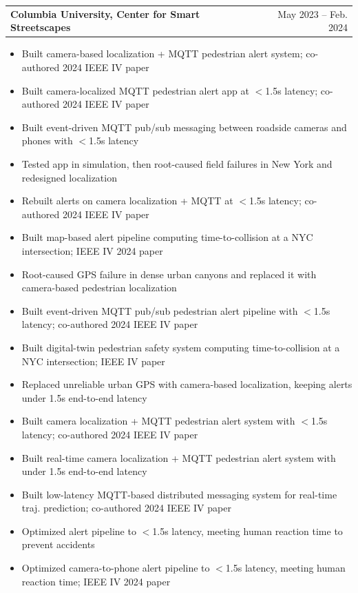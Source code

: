 \documentclass[letterpaper,11pt]{article}
\makeatletter
\newcommand{\resumeItem}[1]{
  \item\small{
    {#1 \vspace{-2pt}}
  }
}
\newcommand{\resumeResearchHeading}[2]{
  \vspace{-2pt}\item
    \begin{tabular*}{0.97\textwidth}[t]{l@{\extracolsep{\fill}}r}
      \textbf{#1} & #2 \\
    \end{tabular*}\vspace{-7pt}
}
\newcommand{\resumeItemListStart}{\begin{itemize}}
\newcommand{\resumeItemListEnd}{\end{itemize}\vspace{-5pt}}
\makeatother
\begin{document}
    \resumeResearchHeading
      {Columbia University, Center for Smart Streetscapes}{May 2023 -- Feb. 2024}
      \resumeItemListStart
        \resumeItem{Built camera-based localization + MQTT pedestrian alert system; co-authored 2024 IEEE IV paper}
        \resumeItem{Built camera-localized MQTT pedestrian alert app at $<$1.5s latency; co-authored 2024 IEEE IV paper}
        \resumeItem{Built event-driven MQTT pub/sub messaging between roadside cameras and phones with $<$1.5s latency}
        \resumeItem{Tested app in simulation, then root-caused field failures in New York and redesigned localization}
        \resumeItem{Rebuilt alerts on camera localization + MQTT at $<$1.5s latency; co-authored 2024 IEEE IV paper}
        \resumeItem{Built map-based alert pipeline computing time-to-collision at a NYC intersection; IEEE IV 2024 paper}
        \resumeItem{Root-caused GPS failure in dense urban canyons and replaced it with camera-based pedestrian localization}
        \resumeItem{Built event-driven MQTT pub/sub pedestrian alert pipeline with $<$1.5s latency; co-authored 2024 IEEE IV paper}
        \resumeItem{Built digital-twin pedestrian safety system computing time-to-collision at a NYC intersection; IEEE IV paper}
        \resumeItem{Replaced unreliable urban GPS with camera-based localization, keeping alerts under 1.5s end-to-end latency}
        \resumeItem{Built camera localization + MQTT pedestrian alert system with $<$1.5s latency; co-authored 2024 IEEE IV paper}
        \resumeItem{Built real-time camera localization + MQTT pedestrian alert system with under 1.5s end-to-end latency}
        \resumeItem{Built low-latency MQTT-based distributed messaging system for real-time traj. prediction; co-authored 2024 IEEE IV paper}
        \resumeItem{Optimized alert pipeline to $<$1.5s latency, meeting human reaction time to prevent accidents}
        \resumeItem{Optimized camera-to-phone alert pipeline to $<$1.5s latency, meeting human reaction time; IEEE IV 2024 paper}
      \resumeItemListEnd
\end{document}
